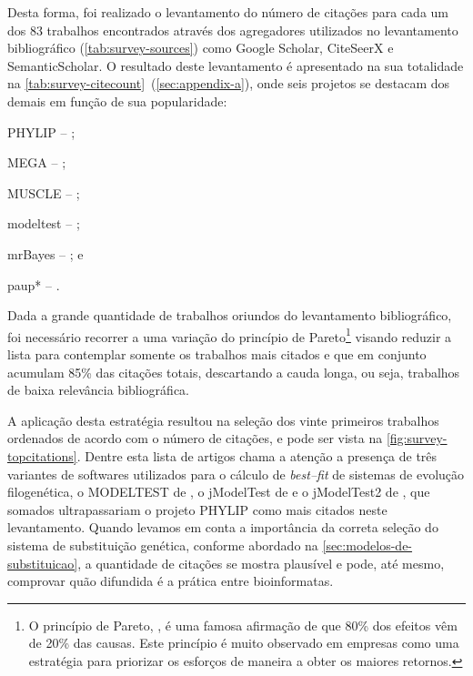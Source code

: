 \documentclass[english,brazilian]{UNISINOSmonografia} %
\begin{document}
Desta forma, foi realizado o levantamento do número de citações para cada um dos 83 trabalhos encontrados através dos agregadores utilizados no levantamento bibliográfico (\autoref{tab:survey-sources}) como Google Scholar, CiteSeerX e SemanticScholar.
O resultado deste levantamento é apresentado na sua totalidade na \autoref{tab:survey-citecount}~(\autoref{sec:appendix-a}),
onde seis projetos se destacam dos demais em função de sua popularidade:
\begin{inparaenum} 
	\item PHYLIP 	-- ;
	\item MEGA 		-- ;
	\item MUSCLE 	-- ;
	\item modeltest -- ;
	\item mrBayes 	-- ; e
	\item paup* 	-- .
\end{inparaenum}
Dada a grande quantidade de trabalhos oriundos do levantamento bibliográfico, foi necessário recorrer a uma variação do princípio de Pareto\footnote{
	O princípio de Pareto, \cite{ParetoPrinciple}, é uma famosa afirmação de que 80\% dos efeitos vêm de 20\% das causas. Este princípio é muito observado em empresas como uma estratégia para priorizar os esforços de maneira a obter os maiores retornos.
} visando reduzir a lista para contemplar somente os trabalhos mais citados e que em conjunto acumulam 85\% das citações totais, descartando a cauda longa, ou seja, trabalhos de baixa relevância bibliográfica.


A aplicação desta estratégia resultou na seleção dos vinte primeiros trabalhos ordenados de acordo com o número de citações, e pode ser vista na \autoref{fig:survey-topcitations}.
Dentre esta lista de artigos chama a atenção a presença de três variantes de softwares utilizados para o cálculo de \textit{best--fit} de sistemas de evolução filogenética, o MODELTEST de , o jModelTest de  e o jModelTest2 de , que somados ultrapassariam o projeto PHYLIP como mais citados neste levantamento.
Quando levamos em conta a importância da correta seleção do sistema de substituição genética, conforme abordado na \autoref{sec:modelos-de-substituicao}, a quantidade de citações se mostra plausível e pode, até mesmo, comprovar quão difundida é a prática entre bioinformatas.
\end{document}
